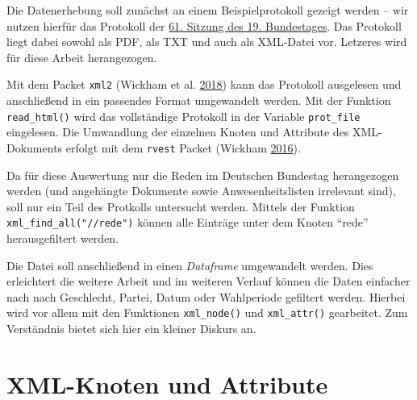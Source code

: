\documentclass[oneside, 12pt, numbers=endperiod]{scrbook}
\newenvironment{Shaded}{\begin{snugshade}}{\end{snugshade}}
\newcommand{\KeywordTok}[1]{\textcolor[rgb]{0.13,0.29,0.53}{\textbf{#1}}}
\newcommand{\NormalTok}[1]{#1}
\newcommand{\OperatorTok}[1]{\textcolor[rgb]{0.81,0.36,0.00}{\textbf{#1}}}
\newcommand{\StringTok}[1]{\textcolor[rgb]{0.31,0.60,0.02}{#1}}
\theoremstyle{definition}
\theoremstyle{definition}
\theoremstyle{definition}
\theoremstyle{remark}
\begin{document}
Die Datenerhebung soll zunächst an einem Beispielprotokoll gezeigt
werden -- wir nutzen hierfür das Protokoll der
\href{https://www.bundestag.de/blob/577958/b2d1fce9b7dec32a1403a2ec5f6bc58d/19061-data.xml}{61.
Sitzung des 19. Bundestages}. Das Protokoll liegt dabei sowohl als PDF,
als TXT und auch als XML-Datei vor. Letzeres wird für diese Arbeit
herangezogen.

Mit dem Packet \texttt{xml2} (Wickham et al.
\protect\hyperlink{ref-wickham_2018}{2018}) kann das Protokoll
ausgelesen und anschließend in ein passendes Format umgewandelt werden.
Mit der Funktion \texttt{read\_html()} wird das vollständige Protokoll
in der Variable \texttt{prot\_file} eingelesen. Die Umwandlung der
einzelnen Knoten und Attribute des XML-Dokuments erfolgt mit dem
\texttt{rvest} Packet (Wickham
\protect\hyperlink{ref-wickham_2016}{2016}).

Da für diese Auswertung nur die Reden im Deutschen Bundestag
herangezogen werden (und angehängte Dokumente sowie Anwesenheitslisten
irrelevant sind), soll nur ein Teil des Protkolls untersucht werden.
Mittels der Funktion \texttt{xml\_find\_all("//rede")} können alle
Einträge unter dem Knoten ``rede'' herausgefiltert werden.

\begin{Shaded}
\end{Shaded}

Die Datei soll anschließend in einen \emph{Dataframe} umgewandelt
werden. Dies erleichtert die weitere Arbeit und im weiteren Verlauf
können die Daten einfacher nach nach Geschlecht, Partei, Datum oder
Wahlperiode gefiltert werden. Hierbei wird vor allem mit den Funktionen
\texttt{xml\_node()} und \texttt{xml\_attr()} gearbeitet. Zum
Verständnis bietet sich hier ein kleiner Diskurs an.

\hypertarget{xml-knoten-und-attribute}{%
\section{XML-Knoten und Attribute}\label{xml-knoten-und-attribute}}
\end{document}
